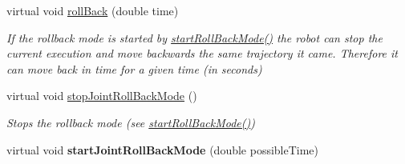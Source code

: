 \begin{DoxyCompactItemize}
virtual void \hyperlink{classkukadu_1_1PlottingControlQueue_a85c659edfd047f21763825b14776e723}{roll\-Back} (double time)
\begin{DoxyCompactList}\small\item\em If the rollback mode is started by \hyperlink{classkukadu_1_1ControlQueue_acb6ba5c61e9c26dcaa8e4073946e3791}{start\-Roll\-Back\-Mode()} the robot can stop the current execution and move backwards the same trajectory it came. Therefore it can move back in time for a given time (in seconds) \end{DoxyCompactList}\item 
\hypertarget{classkukadu_1_1PlottingControlQueue_acc0ddc988115f5904764cd223941f1f5}{virtual void \hyperlink{classkukadu_1_1PlottingControlQueue_acc0ddc988115f5904764cd223941f1f5}{stop\-Joint\-Roll\-Back\-Mode} ()}\label{classkukadu_1_1PlottingControlQueue_acc0ddc988115f5904764cd223941f1f5}

\begin{DoxyCompactList}\small\item\em Stops the rollback mode (see \hyperlink{classkukadu_1_1ControlQueue_acb6ba5c61e9c26dcaa8e4073946e3791}{start\-Roll\-Back\-Mode()}) \end{DoxyCompactList}\item 
\hypertarget{classkukadu_1_1PlottingControlQueue_afd0414e6d232da5fb241d61b6e37f350}{virtual void {\bfseries start\-Joint\-Roll\-Back\-Mode} (double possible\-Time)}\label{classkukadu_1_1PlottingControlQueue_afd0414e6d232da5fb241d61b6e37f350}

\end{DoxyCompactItemize}
